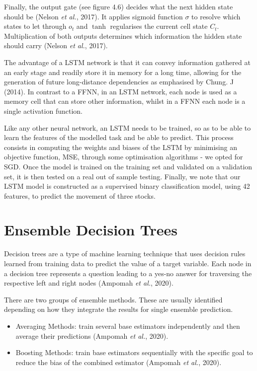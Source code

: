 Finally, the output gate (see figure 4.6) decides what the next hidden state should be (Nelson \textit{et al.}, 2017). It applies sigmoid function $\sigma$ to resolve which states to let through $o_{t}$ and $\tanh$ regularises the current cell state $C_{t}$. Multiplication of both outputs determines which information the hidden state should carry (Nelson \textit{et al.}, 2017).

The advantage of a LSTM network is that it can convey information gathered at an early stage and readily store it in memory for a long time, allowing for the generation of future long-distance dependencies as emphasised by Chung. J (2014). In contrast to a FFNN, in an LSTM network, each node is used as a memory cell that can store other information, whilst in a FFNN each node is a single activation function. 

Like any other neural network, an LSTM needs to be trained, so as to be able to learn the features of the modelled task and be able to predict. This process consists in computing the weights and biases of the LSTM by minimising an objective function, MSE, through some optimisation algorithms - we opted for SGD. Once the model is trained on the training set and validated on a validation set, it is then tested on a real out of sample testing. Finally, we note that our LSTM model is constructed as a supervised binary classification model, using 42 features, to predict the movement of three stocks. 



\section{Ensemble Decision Trees}

Decision trees are a type of machine learning technique that uses decision rules learned from training data to predict the value of a target variable. Each node in a decision tree represents a question leading to a yes-no answer for traversing the respective left and right nodes (Ampomah \textit{et al.}, 2020).



There are two groups of ensemble methods. These are usually identified depending on how they integrate the results for single ensemble prediction. 
\begin{itemize}
\item Averaging Methods: train several base estimators independently and then average their predictions (Ampomah \textit{et al.}, 2020). 
\item Boosting Methods: train base estimators sequentially with the specific goal to reduce the bias of the combined estimator (Ampomah \textit{et al.}, 2020).
\end{itemize}


